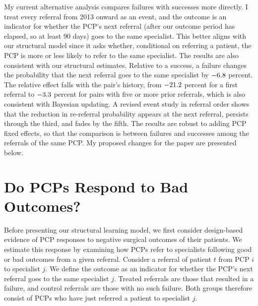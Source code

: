\documentclass[12pt]{article}
\begin{document}
My current alternative analysis compares failures with successes more directly. I treat every referral from 2013 onward as an event, and the outcome is an indicator for whether the PCP's next referral (after our outcome period has elapsed, so at least 90 days) goes to the same specialist. This better aligns with our structural model since it asks whether, conditional on referring a patient, the PCP is more or less likely to refer to the same specialist. The results are also consistent with our structural estimates. Relative to a success, a failure changes the probability that the next referral goes to the same specialist by $-6.8{}$ percent. The relative effect falls with the pair's history, from $-21.2{}$ percent for a first referral to $-3.3{}$ percent for pairs with five or more prior referrals, which is also consistent with Bayesian updating. A revised event study in referral order shows that the reduction in re-referral probability appears at the next referral, persists through the third, and fades by the fifth. The results are robust to adding PCP fixed effects, so that the comparison is between failures and successes among the referrals of the same PCP. My proposed changes for the paper are presented below.

\clearpage
\setcounter{section}{1}
\section{Do PCPs Respond to Bad Outcomes?}
\label{sec:reduced_form}

Before presenting our structural learning model, we first consider design-based evidence of PCP responses to negative surgical outcomes of their patients. We estimate this response by examining how PCPs refer to specialists following good or bad outcomes from a given referral. Consider a referral of patient $t$ from PCP $i$ to specialist $j$. We define the outcome as an indicator for whether the PCP's next referral goes to the same specialist $j$. Treated referrals are those that resulted in a failure, and control referrals are those with no such failure. Both groups therefore consist of PCPs who have just referred a patient to specialist $j$.
\end{document}
